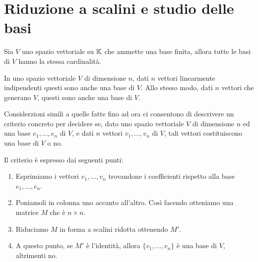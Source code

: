 \section{Riduzione a scalini e studio delle basi}

\begin{theorem}
	Sia $V$ uno spazio vettoriale su $\mathbb{K}$ che ammette una base
	finita, allora tutte le basi di $V$ hanno la stessa cardinalità.
\end{theorem}

\begin{corollary}
	In uno spazio vettoriale $V$ di dimensione $n$, dati $n$ vettori
	linearmente indipendenti questi sono anche una base di $V$. Allo
	stesso modo, dati $n$ vettori che generano $V$, questi sono anche una
	base di $V$.
\end{corollary}

Considerzioni simili a quelle fatte fino ad ora ci consentono di descrivere
un criterio concreto per decidere se, dato uno spazio vettoriale $V$ di
dimensione $n$ ed una base $e_1, \dots, e_n$ di $V$, e dati $n$ vettori
$v_1, \dots, v_n$ di $V$, tali vettori costituiscono una base di $V$ o no.

Il criterio è espresso dai seguenti punti:
\begin{enumerate}
	\item Esprimiamo i vettori $v_1, \dots, v_n$ trovandone i coefficienti rispetto
	      alla base $e_1, \dots, e_n$.
	\item Poniamoli in colonna uno accanto all'altro. Così facendo otteniamo una
	      matrice $M$ che è $n \times n$.
	\item Riduciamo $M$ in forma a scalini ridotta ottenendo $M'$.
	\item A questo punto, se $M'$ è l'identità, allora $\{v_1, \dots, v_n\}$
	      è una base di $V$, altrimenti no.
\end{enumerate}

